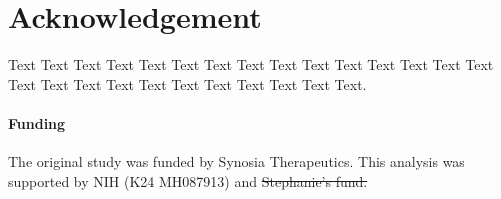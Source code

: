 \section*{Acknowledgement}
Text Text Text Text Text Text  Text Text Text Text Text Text Text Text  Text Text Text Text Text Text Text Text Text  Text Text Text.

\paragraph{Funding\textcolon} The original study was funded by Synosia Therapeutics. This analysis was supported by NIH (K24 MH087913) and \sout{Stephanie's fund.}
